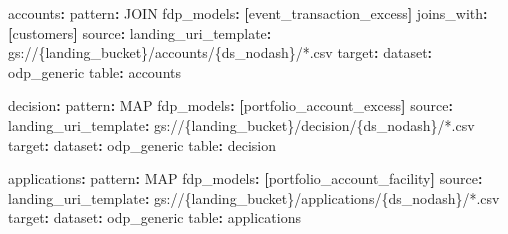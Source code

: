 \documentclass[
  11pt,
  british,
  oneside]{book}
\newenvironment{Shaded}{\begin{snugshade}}{\end{snugshade}}
\newcommand{\AttributeTok}[1]{\textcolor[rgb]{0.77,0.63,0.00}{#1}}
\newcommand{\FunctionTok}[1]{\textcolor[rgb]{0.00,0.00,0.00}{#1}}
\newcommand{\KeywordTok}[1]{\textcolor[rgb]{0.13,0.29,0.53}{\textbf{#1}}}
\begin{document}
\begin{Shaded}
\begin{Highlighting}[]
\AttributeTok{  }\FunctionTok{accounts}\KeywordTok{:}
\AttributeTok{    }\FunctionTok{pattern}\KeywordTok{:}\AttributeTok{ JOIN}
\AttributeTok{    }\FunctionTok{fdp\_models}\KeywordTok{:}\AttributeTok{ }\KeywordTok{[}\AttributeTok{event\_transaction\_excess}\KeywordTok{]}
\AttributeTok{    }\FunctionTok{joins\_with}\KeywordTok{:}\AttributeTok{ }\KeywordTok{[}\AttributeTok{customers}\KeywordTok{]}
\AttributeTok{    }\FunctionTok{source}\KeywordTok{:}
\AttributeTok{      }\FunctionTok{landing\_uri\_template}\KeywordTok{:}\AttributeTok{ gs://\{landing\_bucket\}/accounts/\{ds\_nodash\}/*.csv}
\AttributeTok{    }\FunctionTok{target}\KeywordTok{:}
\AttributeTok{      }\FunctionTok{dataset}\KeywordTok{:}\AttributeTok{ odp\_generic}
\AttributeTok{      }\FunctionTok{table}\KeywordTok{:}\AttributeTok{ accounts}

\AttributeTok{  }\FunctionTok{decision}\KeywordTok{:}
\AttributeTok{    }\FunctionTok{pattern}\KeywordTok{:}\AttributeTok{ MAP}
\AttributeTok{    }\FunctionTok{fdp\_models}\KeywordTok{:}\AttributeTok{ }\KeywordTok{[}\AttributeTok{portfolio\_account\_excess}\KeywordTok{]}
\AttributeTok{    }\FunctionTok{source}\KeywordTok{:}
\AttributeTok{      }\FunctionTok{landing\_uri\_template}\KeywordTok{:}\AttributeTok{ gs://\{landing\_bucket\}/decision/\{ds\_nodash\}/*.csv}
\AttributeTok{    }\FunctionTok{target}\KeywordTok{:}
\AttributeTok{      }\FunctionTok{dataset}\KeywordTok{:}\AttributeTok{ odp\_generic}
\AttributeTok{      }\FunctionTok{table}\KeywordTok{:}\AttributeTok{ decision}

\AttributeTok{  }\FunctionTok{applications}\KeywordTok{:}
\AttributeTok{    }\FunctionTok{pattern}\KeywordTok{:}\AttributeTok{ MAP}
\AttributeTok{    }\FunctionTok{fdp\_models}\KeywordTok{:}\AttributeTok{ }\KeywordTok{[}\AttributeTok{portfolio\_account\_facility}\KeywordTok{]}
\AttributeTok{    }\FunctionTok{source}\KeywordTok{:}
\AttributeTok{      }\FunctionTok{landing\_uri\_template}\KeywordTok{:}\AttributeTok{ gs://\{landing\_bucket\}/applications/\{ds\_nodash\}/*.csv}
\AttributeTok{    }\FunctionTok{target}\KeywordTok{:}
\AttributeTok{      }\FunctionTok{dataset}\KeywordTok{:}\AttributeTok{ odp\_generic}
\AttributeTok{      }\FunctionTok{table}\KeywordTok{:}\AttributeTok{ applications}


\end{Highlighting}
\end{Shaded}
\end{document}
